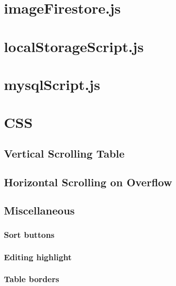 \documentclass[letterpaper]{article}
\begin{document}
\newpage

\section{imageFirestore.js}

\newpage

\section{localStorageScript.js}

\newpage

\section{mysqlScript.js}

\newpage

\section{CSS}\label{CSS}

\subsection{Vertical Scrolling Table}
\subsection{Horizontal Scrolling on Overflow}\label{overflow-x}
\subsection{Miscellaneous}
\subsubsection{Sort buttons}
\subsubsection{Editing highlight}
\subsubsection{Table borders}
\end{document}

